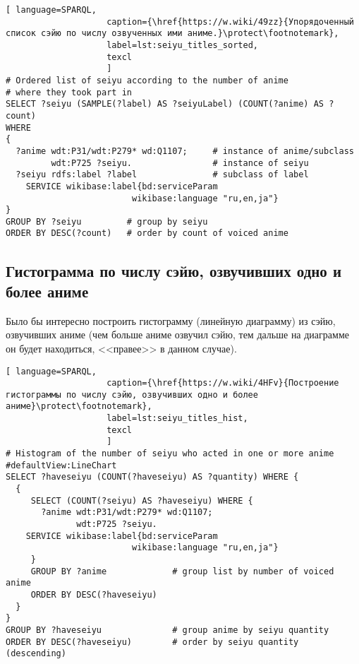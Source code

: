 \begin{lstlisting}[ language=SPARQL, 
                    caption={\href{https://w.wiki/49zz}{Упорядоченный список сэйю по числу озвученных ими аниме.}\protect\footnotemark},
                    label=lst:seiyu_titles_sorted,
                    texcl 
                    ]
# Ordered list of seiyu according to the number of anime
# where they took part in
SELECT ?seiyu (SAMPLE(?label) AS ?seiyuLabel) (COUNT(?anime) AS ?count)
WHERE
{
  ?anime wdt:P31/wdt:P279* wd:Q1107;	 # instance of anime/subclass
         wdt:P725 ?seiyu. 	             # instance of seiyu
  ?seiyu rdfs:label ?label	             # subclass of label
    SERVICE wikibase:label{bd:serviceParam
					     wikibase:language "ru,en,ja"}
}
GROUP BY ?seiyu		    # group by seiyu 
ORDER BY DESC(?count)	# order by count of voiced anime
\end{lstlisting}%

\subsection{Гистограмма по числу сэйю, озвучивших одно и более аниме}

Было бы интересно построить гистограмму (линейную диаграмму) из сэйю, озвучивших аниме (чем больше аниме озвучил сэйю, тем дальше на диаграмме он будет находиться, <<правее>> в данном случае).

\begin{lstlisting}[ language=SPARQL, 
                    caption={\href{https://w.wiki/4HFv}{Построение гистограммы по числу сэйю, озвучивших одно и более аниме}\protect\footnotemark},
                    label=lst:seiyu_titles_hist,
                    texcl 
                    ]
# Histogram of the number of seiyu who acted in one or more anime
#defaultView:LineChart
SELECT ?haveseiyu (COUNT(?haveseiyu) AS ?quantity) WHERE {
  {
     SELECT (COUNT(?seiyu) AS ?haveseiyu) WHERE {
       ?anime wdt:P31/wdt:P279* wd:Q1107;
              wdt:P725 ?seiyu.
    SERVICE wikibase:label{bd:serviceParam
					     wikibase:language "ru,en,ja"}
     }
     GROUP BY ?anime             # group list by number of voiced anime
     ORDER BY DESC(?haveseiyu) 
  }
}
GROUP BY ?haveseiyu              # group anime by seiyu quantity
ORDER BY DESC(?haveseiyu)        # order by seiyu quantity (descending)
\end{lstlisting}%

